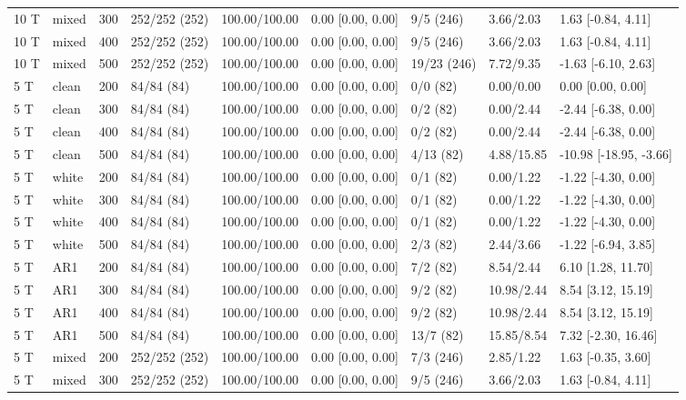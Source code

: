 \documentclass[10pt]{article}
\begin{document}
\begin{longtable}{@{}lllllllll@{}}
10 T & mixed & 300 & 252/252 (252) & 100.00/100.00 & 0.00 [0.00, 0.00] & 9/5 (246) & 3.66/2.03 & 1.63 [-0.84, 4.11] \\
10 T & mixed & 400 & 252/252 (252) & 100.00/100.00 & 0.00 [0.00, 0.00] & 9/5 (246) & 3.66/2.03 & 1.63 [-0.84, 4.11] \\
10 T & mixed & 500 & 252/252 (252) & 100.00/100.00 & 0.00 [0.00, 0.00] & 19/23 (246) & 7.72/9.35 & -1.63 [-6.10, 2.63] \\
5 T & clean & 200 & 84/84 (84) & 100.00/100.00 & 0.00 [0.00, 0.00] & 0/0 (82) & 0.00/0.00 & 0.00 [0.00, 0.00] \\
5 T & clean & 300 & 84/84 (84) & 100.00/100.00 & 0.00 [0.00, 0.00] & 0/2 (82) & 0.00/2.44 & -2.44 [-6.38, 0.00] \\
5 T & clean & 400 & 84/84 (84) & 100.00/100.00 & 0.00 [0.00, 0.00] & 0/2 (82) & 0.00/2.44 & -2.44 [-6.38, 0.00] \\
5 T & clean & 500 & 84/84 (84) & 100.00/100.00 & 0.00 [0.00, 0.00] & 4/13 (82) & 4.88/15.85 & -10.98 [-18.95, -3.66] \\
5 T & white & 200 & 84/84 (84) & 100.00/100.00 & 0.00 [0.00, 0.00] & 0/1 (82) & 0.00/1.22 & -1.22 [-4.30, 0.00] \\
5 T & white & 300 & 84/84 (84) & 100.00/100.00 & 0.00 [0.00, 0.00] & 0/1 (82) & 0.00/1.22 & -1.22 [-4.30, 0.00] \\
5 T & white & 400 & 84/84 (84) & 100.00/100.00 & 0.00 [0.00, 0.00] & 0/1 (82) & 0.00/1.22 & -1.22 [-4.30, 0.00] \\
5 T & white & 500 & 84/84 (84) & 100.00/100.00 & 0.00 [0.00, 0.00] & 2/3 (82) & 2.44/3.66 & -1.22 [-6.94, 3.85] \\
5 T & AR1 & 200 & 84/84 (84) & 100.00/100.00 & 0.00 [0.00, 0.00] & 7/2 (82) & 8.54/2.44 & 6.10 [1.28, 11.70] \\
5 T & AR1 & 300 & 84/84 (84) & 100.00/100.00 & 0.00 [0.00, 0.00] & 9/2 (82) & 10.98/2.44 & 8.54 [3.12, 15.19] \\
5 T & AR1 & 400 & 84/84 (84) & 100.00/100.00 & 0.00 [0.00, 0.00] & 9/2 (82) & 10.98/2.44 & 8.54 [3.12, 15.19] \\
5 T & AR1 & 500 & 84/84 (84) & 100.00/100.00 & 0.00 [0.00, 0.00] & 13/7 (82) & 15.85/8.54 & 7.32 [-2.30, 16.46] \\
5 T & mixed & 200 & 252/252 (252) & 100.00/100.00 & 0.00 [0.00, 0.00] & 7/3 (246) & 2.85/1.22 & 1.63 [-0.35, 3.60] \\
5 T & mixed & 300 & 252/252 (252) & 100.00/100.00 & 0.00 [0.00, 0.00] & 9/5 (246) & 3.66/2.03 & 1.63 [-0.84, 4.11] \\

\end{longtable}
\end{document}
